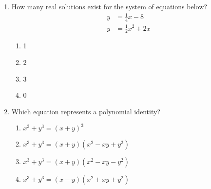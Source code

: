 \documentclass[12pt, twoside]{article}
\begin{document}
\begin{enumerate}[itemsep=0.5cm]
\item How many real solutions exist for the system of equations below?
\begin{align*}
    y &= \frac{1}{4} x - 8 \\
    y &= \frac{1}{2} x^2 + 2x
\end{align*}
\begin{enumerate}
    \item 1
    \item 2
    \item 3
    \item 0
\end{enumerate}

\item Which equation represents a polynomial identity?
\begin{enumerate}
    \item \(x^3 + y^3 = (x + y)^3\)
    \item \(x^3 + y^3 = (x + y)(x^2 - xy + y^2)\)
    \item \(x^3 + y^3 = (x + y)(x^2 - xy - y^2)\)
    \item \(x^3 + y^3 = (x - y)(x^2 + xy + y^2)\)
\end{enumerate}


\end{enumerate}
\end{document}
